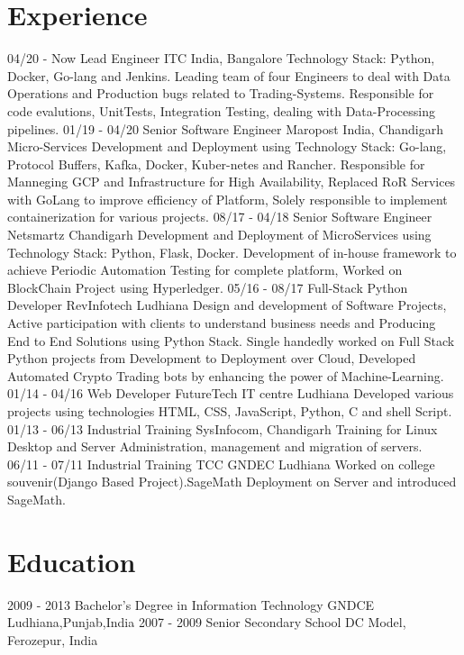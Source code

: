 \documentclass[]{friggeri-cv}
\begin{document}
\section{Experience}
\begin{entrylist}
  \entry
  {04/20 - Now }
  {Lead Engineer}
  {ITC India, Bangalore}
  {Technology Stack: Python, Docker, Go-lang and Jenkins. Leading team of four Engineers to deal with Data Operations and Production bugs related to Trading-Systems. Responsible for code evalutions, UnitTests,
  Integration Testing, dealing with Data-Processing pipelines.}
  \entry
    {01/19 - 04/20 }
    {Senior Software Engineer}
    {Maropost India, Chandigarh}
    {Micro-Services Development and Deployment using Technology Stack: Go-lang, Protocol Buffers, Kafka, Docker, Kuber-netes and Rancher. Responsible for Manneging GCP and Infrastructure
    for High Availability, Replaced RoR Services with GoLang to improve efficiency of Platform, Solely responsible to implement containerization for various projects.}
   \entry
    {08/17 - 04/18}
    {Senior Software Engineer}
    {Netsmartz Chandigarh}
    {Development and Deployment of MicroServices using Technology Stack: Python, Flask, Docker. Development of in-house framework to achieve Periodic Automation Testing for complete platform,
    Worked on BlockChain Project using Hyperledger.}
  \entry
    {05/16 - 08/17}
    {Full-Stack Python Developer}
    {RevInfotech Ludhiana}
    {Design and development of Software Projects, Active participation with clients to understand business needs and Producing End to End Solutions using Python Stack. Single handedly worked on Full Stack
    Python projects from Development to Deployment over Cloud, Developed Automated Crypto Trading bots by enhancing the power of Machine-Learning.\\}
    \entry
    {01/14 - 04/16}
    {Web Developer}
    {FutureTech IT centre Ludhiana}
    {Developed various projects using technologies HTML, CSS, JavaScript, Python, C and shell Script.\\}
    \entry
    {01/13 - 06/13}
    {Industrial Training}
    {SysInfocom, Chandigarh}
    {Training for Linux Desktop and Server Administration, management and migration of servers.\\}
    \entry
    {06/11 - 07/11}
    {Industrial Training}
    {TCC GNDEC Ludhiana}
    {Worked on college souvenir(Django Based Project).SageMath Deployment on Server and introduced SageMath.\\}
\end{entrylist}
\section{Education}
\begin{entrylist}
  \entry
    {2009 - 2013}
    {Bachelor's Degree in Information Technology}
    {GNDCE Ludhiana,Punjab,India}
    {\emph{}}
  \entry
    {2007 - 2009}
    {Senior Secondary School}
    {DC Model, Ferozepur, India}
    {\emph{}}
\end{entrylist}
\end{document}
